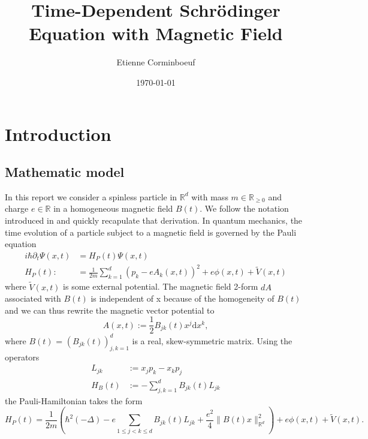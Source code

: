\documentclass{article}
\title{Time-Dependent Schr{\"o}dinger Equation with Magnetic Field}
\author{Etienne Corminboeuf}
\date{\today}
\begin{document}
\maketitle

\tableofcontents

\section{Introduction}

\subsection{Mathematic model}

In this report we consider a spinless particle in $\mathbb{R}^d$ with mass $m \in \mathbb{R}_{\geq 0}$ and charge $e\in \mathbb{R}$ in a homogeneous magnetic field $B(t)$. We follow the notation introduced in \cite{paper_orvg} and quickly recapulate that derivation.
In quantum mechanics, the time evolution of a particle subject to a magnetic field is governed by the Pauli equation
\begin{align} \label{eq_pauli}
  i \hbar \partial_t \Psi(x,t) &= H_P(t)\Psi(x,t) \\
  H_P(t) :&= \frac{1}{2m} \sum_{k=1}^d (p_k - e A_k(x,t))^2 + e\phi(x,t) + \tilde{V}(x,t)
\end{align}
where $\tilde{V}(x,t)$ is some external potential.
The magnetic field 2-form $dA$ associated with $B(t)$ is independent of x because of the homogeneity of $B(t)$ and we can thus rewrite the magnetic vector potential to
\begin{equation}
  A(x,t) := \frac{1}{2}B_{jk}(t)x^j \textrm{d}x^k,
\end{equation}
where $B(t)$ = $(B_{jk}(t))_{j,k = 1}^d$ is a real, skew-symmetric matrix. Using the operators
\begin{align}
  L_{jk} & := x_j p_k - x_k p_j \\
  H_B(t) & := - \sum_{j,k = 1}^d B_{jk}(t) L_{jk}
\end{align}
the Pauli-Hamiltonian takes the form
\begin{equation}
  H_P(t) = \frac{1}{2 m} \left(\hbar^{2}(-\Delta)-e \sum_{1 \leqslant j<k \leqslant d} B_{j k}(t) L_{j k} +\frac{e^{2}}{4}\|B(t) x\|_{\mathbb{R}^{d}}^{2}  \right) + e \phi(x,t) + \tilde{V}(x,t).
\end{equation}
\end{document}
